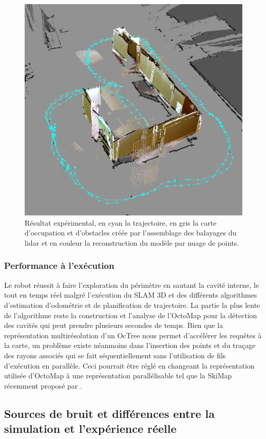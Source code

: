 \begin{figure}[!ht]
  \centering
  \includegraphics[width=0.5\linewidth]{images/exp_angled_view}
  \caption[Résultat de l'expérience par UGV]{Résultat expérimental, en cyan la trajectoire, en gris la carte d'occupation et d'obstacles créée par l'assemblage des balayages du lidar et en couleur la reconstruction du modèle par nuage de points.}
  \label{fig:exp_angled_view}
\end{figure}

\subsubsection{Performance à l'exécution}

Le robot réussit à faire l'exploration du périmètre en sautant la cavité interne, le tout en temps réel malgré l'exécution du SLAM 3D et des différents algorithmes d'estimation d'odométrie et de planification de trajectoire. La partie la plus lente de l'algorithme reste la construction et l'analyse de l'OctoMap pour la détection des cavités qui peut prendre plusieurs secondes de temps. Bien que la représentation multirésolution d'un OcTree nous permet d'accélérer les requêtes à la carte, un problème existe néanmoins dans l'insertion des points et du traçage des rayons associés qui se fait séquentiellement sans l'utilisation de fils d'exécution en parallèle. Ceci pourrait être réglé en changeant la représentation utilisée d'OctoMap à une représentation parallélisable tel que la SkiMap récemment proposé par \cite{Gregorio2017}.

\subsection{Sources de bruit et différences entre la simulation et l'expérience réelle}
\label{subsec:ugv_noise_sim}

